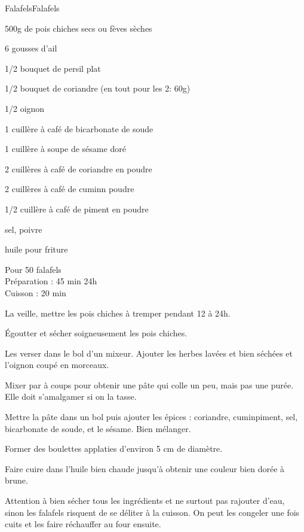 \begin{recette}{Falafels}{Falafels}

\begin{ingredients}
500g de pois chiches secs ou fèves sèches\par
6 gousses d'ail\par
1/2 bouquet de persil plat\par
1/2 bouquet de coriandre (en tout pour les 2: 60g)\par
1/2 oignon\par
1 cuillère à café de bicarbonate de soude\par
1 cuillère à soupe de sésame doré\par
2 cuillères à café de coriandre en poudre\par
2 cuillères à café de cuminn poudre\par
1/2 cuillère à café de piment en poudre\par
sel, poivre\par
huile pour friture\par
\end{ingredients}

\begin{infos}
Pour 50 falafels\\
Préparation : 45 min 24h\\
Cuisson : 20 min\\
\end{infos}

\begin{etapes}
\item La veille, mettre les pois chiches à tremper pendant 12 à 24h.
\item Égoutter et sécher soigneusement les pois chiches.
\item Les verser dans le bol d'un mixeur. Ajouter les herbes lavées et bien séchées et l'oignon coupé en morceaux.
\item Mixer par à coups pour obtenir une pâte qui colle un peu, mais pas une purée. Elle doit s'amalgamer si on la tasse.
\item Mettre la pâte dans un bol puis ajouter les épices : coriandre, cuminpiment, sel, bicarbonate de soude, et le sésame. Bien mélanger.
\item Former des boulettes applaties d'environ 5 cm de diamètre.
\item Faire cuire dans l'huile bien chaude jusqu'à obtenir une couleur bien dorée à brune.
\end{etapes}

\begin{conseils}
Attention à bien sécher tous les ingrédients et ne surtout pas rajouter d'eau, sinon les falafels risquent de se déliter à la cuisson.
On peut les congeler une fois cuits et les faire réchauffer au four ensuite.
\end{conseils}

\end{recette}
